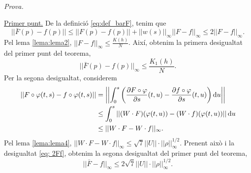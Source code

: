 {
\color{green!50!black}
\textit{Prova.}

\underline{Primer punt.}
De la definició \ref{eq:def_barF}, tenim que
\begin{equation}\label{eq: 2Ff}
    ||\bar F(p)-f(p)||\le||F(p)-f(p)|| + ||w(s)||_\infty ||F-f||_\infty \le 2||F-f||_\infty.
\end{equation}
Pel lema \ref{lema:lema2}, $||F-f||_\infty\le\frac{K(h)}{N}$. Així, obtenim la primera desigualtat del primer punt del teorema,
\begin{equation*}
    ||\bar F(p)-f(p)||_\infty\le\frac{K_1(h)}{N}.
\end{equation*}
Per la segona desigualtat, considerem
\begin{align*}
    ||F\circ\varphi(t,s)-f\circ\varphi(t,s)|| &= \left|\left|\int_0^s \left( \frac{\partial F\circ\varphi}{\partial s}(t,u) -  \frac{\partial f\circ\varphi}{\partial s}(t,u)\right)\text du\right|\right|\\
    &\le \int_0^s\left|\left| 
        (W\cdot F)(\varphi(t,u)) - (W\cdot f)(\varphi(t,u))
    \right|\right|\text du\\
    &\le ||W\cdot F-W\cdot f||_\infty.
\end{align*}
Pel lema \ref{lema:lema4}, $||W\cdot F-W\cdot f||_\infty\le\sqrt7||U||\cdot||\rho||^{1/2}_\infty$. Prenent això i la desigualtat \ref{eq: 2Ff}, obtenim la segona desigualtat del primer punt del teorema,
\begin{equation*}
    ||\bar F-f||_\infty\le 2\sqrt7||U||\cdot||\rho||^{1/2}_\infty.
\end{equation*}

}

